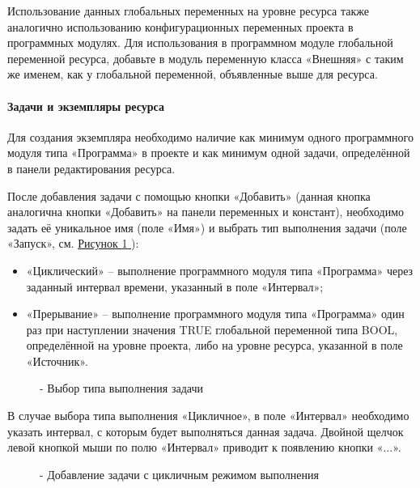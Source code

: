 \documentclass[letterpaper,10pt,russian]{sphinxmanual}
\begin{document}
Использование данных глобальных переменных на уровне ресурса также
аналогично использованию конфигурационных переменных проекта в
программных модулях. Для использования в программном модуле глобальной
переменной ресурса, добавьте в модуль переменную класса «Внешняя» с
таким же именем, как у глобальной переменной, объявленные выше для
ресурса.


\paragraph{Задачи и экземпляры ресурса}
\label{usage_guide/work_with_project:id12}
Для создания экземпляра необходимо наличие как минимум одного
программного модуля типа «Программа» в проекте и как минимум одной
задачи, определённой в панели редактирования ресурса.

После добавления задачи с помощью кнопки «Добавить» (данная кнопка
аналогична кнопки «Добавить» на панели переменных и констант),
необходимо задать её уникальное имя (поле «Имя») и выбрать тип
выполнения задачи (поле «Запуск», см. \hyperref[usage_guide/work_with_project:image196]{Рисунок \ref{usage_guide/work_with_project:image196} }):
\begin{itemize}
\item {} 
«Циклический» – выполнение программного модуля типа «Программа» через
заданный интервал времени, указанный в поле «Интервал»;

\item {} 
«Прерывание» – выполнение программного модуля типа «Программа» один
раз при наступлении значения TRUE глобальной переменной типа BOOL,
определённой на уровне проекта, либо на уровне ресурса, указанной в
поле «Источник».

\end{itemize}
\begin{figure}[htbp]
\centering
\capstart

\noindent{}
\caption{- Выбор типа выполнения задачи}\label{usage_guide/work_with_project:image196}\end{figure}

В случае выбора типа выполнения «Цикличное», в поле «Интервал»
необходимо указать интервал, с которым будет выполняться данная задача.
Двойной щелчок левой кнопкой мыши по полю «Интервал» приводит к
появлению кнопки «...».
\begin{figure}[htbp]
\centering
\capstart

\noindent{}
\caption{- Добавление задачи с цикличным режимом выполнения}\label{usage_guide/work_with_project:image197}\end{figure}
\end{document}
